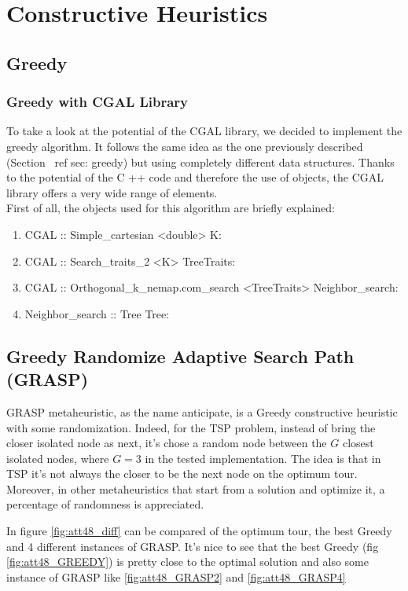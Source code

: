 \chapter{Constructive Heuristics}

\section{Greedy}\label{sec:greedy}
\subsection{Greedy with CGAL Library}
To take a look at the potential of the CGAL library, we decided to implement the greedy algorithm. It follows the same idea as the one previously described (Section \ ref {sec: greedy}) but using completely different data structures. Thanks to the potential of the C ++ code and therefore the use of objects, the CGAL library offers a very wide range of elements.\\ First of all, the objects used for this algorithm are briefly explained:
\begin{enumerate}
\item CGAL :: Simple\_cartesian <double> K: 
\item CGAL :: Search\_traits\_2 <K> TreeTraits:
\item CGAL :: Orthogonal\_k\_nemap.com\_search <TreeTraits> Neighbor\_search:
\item Neighbor\_search :: Tree Tree:
\end{enumerate}

\section{Greedy Randomize Adaptive Search Path (GRASP)}
GRASP metaheuristic, as the name anticipate, is a Greedy constructive heuristic with some randomization. Indeed, for the TSP problem, instead of bring the closer isolated node as next, it's chose a random node between the $ G $ closest isolated nodes, where $ G = 3 $ in the tested implementation.
The idea is that in TSP it's not always the closer to be the next node on the optimum tour. Moreover, in other metaheuristics that start from a solution and optimize it, a percentage of randomness is appreciated.

In figure \ref{fig:att48_diff} can be compared of the optimum tour, the best Greedy and 4 different instances of GRASP. It's nice to see that the best Greedy (fig \ref{fig:att48_GREEDY}) is pretty close to the optimal solution and also some instance of GRASP like \ref{fig:att48_GRASP2} and \ref{fig:att48_GRASP4}

